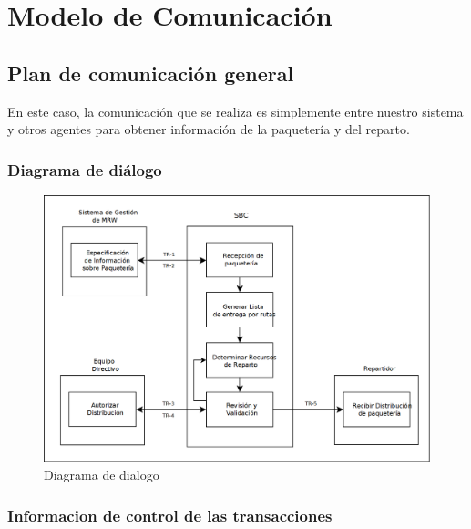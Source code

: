 

\chapter{Modelo de Comunicación}

\section{Plan de comunicación general}

En este caso, la comunicación que se realiza es simplemente entre nuestro sistema y otros agentes para obtener información de la paquetería y del reparto.

\subsection{Diagrama de diálogo}

  \begin{figure}[H]
    \centering
    \includegraphics[scale=0.30]{imaxes/Comunicaciones.png}
    \caption{\label{fig:Comunicaciones}Diagrama de dialogo}
  \end{figure}
  
\subsection{Informacion de control de las transacciones}

